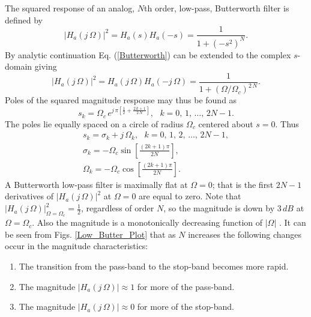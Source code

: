 \documentclass{sebase}
\begin{document}
The squared response of an analog, $N$th order, low-pass, Butterworth filter
is defined by 
\begin{equation}
\left| H_{a}\left( j\,\Omega \right) \right| ^{2}=H_{a}\left( s\right)
H_{a}\left( -s\right) =\frac{1}{1+\left( -s^{2}\right) ^{N}}.
\label{Butterworth}
\end{equation}
By analytic continuation Eq. (\ref{Butterworth}) can be extended to the
complex $s$-domain giving 
\begin{equation}
\left| H_{a}\left( j\,\Omega \right) \right| ^{2}=H_{a}\left( j\,\Omega
\right) H_{a}\left( -j\,\Omega \right) =\frac{1}{1+\left( \Omega /\Omega
_{c}\right) ^{2\,N}}.  \label{Butterworth2}
\end{equation}
Poles of the squared magnitude response may thus be found as 
\begin{equation}
s_{k}=\Omega _{c}\,e^{j\,\pi \left[ \frac{1}{2}+\frac{2\,k+1}{2\,N}\right] },%
\text{ \ \ \ \ }k=0,\,1,\,\ldots ,\,2N-1.
\end{equation}
The poles lie equally spaced on a circle of radius $\Omega _{c}$ centered
about $s=0$. Thus 
\begin{gather}
s_{k}=\sigma _{k}+j\,\Omega _{k},\text{ \ \ \ \ }k=0,\,1,\,2,\,\ldots
,\,2N-1,  \label{Butter_Poles} \\
\sigma _{k}=-\Omega _{c}\sin \left[ \frac{\left( 2k+1\right) \pi }{2N}\right]
,  \label{Butter_Real_Part} \\
\Omega _{k}=-\Omega _{c}\cos \left[ \frac{\left( 2k+1\right) \pi }{2N}\right]
.  \label{Butter_Imag_Part}
\end{gather}
A Butterworth low-pass filter is maximally flat at $\Omega =0$; that is the
first $2N-1$ derivatives of $\left| H_{a}\left( j\,\Omega \right) \right|
^{2}$ at $\Omega =0$ are equal to zero. Note that $\left| H_{a}(j\,\Omega
)\right| _{\Omega =\Omega _{c}}^{2}=\frac{1}{2}$, regardless of order $N$,
so the magnitude is down by $3\,dB$ at $\Omega =\Omega _{c}$. Also the
magnitude is a monotonically decreasing function of $\left| \Omega \right| $%
. It can be seen from Figs. \ref{Low_Butter_Plot} that as $N$ increases the
following changes occur in the magnitude characteristics:

\begin{enumerate}
\item The transition from the pass-band to the stop-band becomes more rapid.

\item The magnitude $\left| H_{a}\left( j\,\Omega \right) \right| \approx 1$
for more of the pass-band.

\item The magnitude $\left| H_{a}\left( j\,\Omega \right) \right| \approx 0$
for more of the stop-band.
\end{enumerate}
\end{document}

